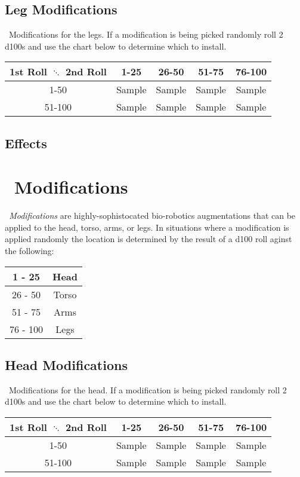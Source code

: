 \subsection{Leg Modifications}
\dieselt\ Modifications for the legs. If a modification is being picked randomly roll 2 d100s and use the chart below to determine which to install.
\begin{center}
\begin{tabular}{c | c | c | c | c}
1st Roll $\ddots$ 2nd Roll & 1-25 & 26-50 & 51-75 & 76-100 \\
\hline
1-50 & Sample & Sample & Sample & Sample\\
\hline
51-100 & Sample & Sample & Sample & Sample\\
\end{tabular}
\end{center}
\subsection*{Effects}
\begin{multicols}{2}
\end{multicols}
\clearpage


\section{\cybert\ Modifications}\label{sec:cybr_mods}
\emph{\cybert\ Modifications} are highly-sophistocated bio-robotics augmentations that can be applied to the head, torso, arms, or legs. In situations where a modification is applied randomly the location is determined by the result of a d100 roll aginst the following:
\begin{center}
\begin{tabular}{c | c}
1 - 25 & Head \\
\hline
26 - 50 & Torso \\
\hline
51 - 75 & Arms \\
\hline
76 - 100 & Legs \\
\end{tabular}
\end{center}

\subsection{Head Modifications}
\cybert\ Modifications for the head. If a modification is being picked randomly roll 2 d100s and use the chart below to determine which to install.
\begin{center}
\begin{tabular}{c | c | c | c | c}
1st Roll $\ddots$ 2nd Roll & 1-25 & 26-50 & 51-75 & 76-100 \\
\hline
1-50 & Sample & Sample & Sample & Sample\\
\hline
51-100 & Sample & Sample & Sample & Sample\\
\end{tabular}
\end{center}
